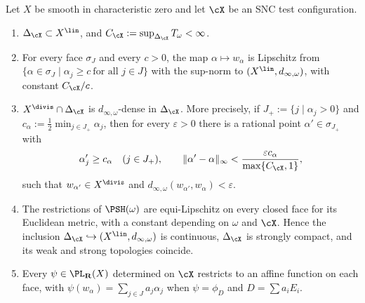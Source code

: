 \begin{proposition}
\label{prop:ch49-dual-complex}
Let $X$ be smooth in characteristic zero and let $\cX$ be an SNC
test configuration.
\begin{enumerate}
\item\label{itm:ch49-dc:contained}
      $\Delta_\cX\subset X^{\lin}$, and
      $C_\cX:=\sup_{\Delta_\cX}T_\omega<\infty$.
\item\label{itm:ch49-dc:lipschitz}
      For every face $\sigma_J$ and every $c>0$, the map
      $\alpha\mapsto w_\alpha$ is Lipschitz from
      $\{\alpha\in\sigma_J\mid\alpha_j\ge c\ \text{for all }j\in J\}$
      with the sup-norm to $(X^{\lin},d_{\infty,\omega})$, with constant
      $C_\cX/c$.
\item\label{itm:ch49-dc:density}
      $X^{\divis}\cap\Delta_\cX$ is $d_{\infty,\omega}$-dense in
      $\Delta_\cX$.  More precisely, if
      $J_+:=\{j\mid\alpha_j>0\}$ and
      $c_\alpha:=\frac12\min_{j\in J_+}\alpha_j$, then for every
      $\varepsilon>0$ there is a rational point
      $\alpha'\in\sigma_{J_+}$ with
      \[
       \alpha'_j\ge c_\alpha\quad(j\in J_+),\qquad
       \|\alpha'-\alpha\|_\infty
       <\frac{\varepsilon c_\alpha}{\max\{C_\cX,1\}},
      \]
      such that $w_{\alpha'}\in X^{\divis}$ and
      $d_{\infty,\omega}(w_{\alpha'},w_\alpha)<\varepsilon$.
\item\label{itm:ch49-dc:compact}
      The restrictions of $\PSH(\omega)$ are equi-Lipschitz on every
      closed face for its Euclidean metric, with a constant depending on
      $\omega$ and $\cX$.  Hence the inclusion
      $\Delta_\cX\hookrightarrow(X^{\lin},d_{\infty,\omega})$
      is continuous, $\Delta_\cX$ is strongly compact, and its weak and
      strong topologies coincide.
\item\label{itm:ch49-dc:affine}
      Every $\psi\in\PL_{\mathbf R}(X)$ determined on $\cX$ restricts
      to an affine function on each face, with
      $\psi(w_\alpha)=\sum_{j\in J}a_j\alpha_j$ when
      $\psi=\phi_D$ and $D=\sum a_iE_i$.
\end{enumerate}
\end{proposition}


